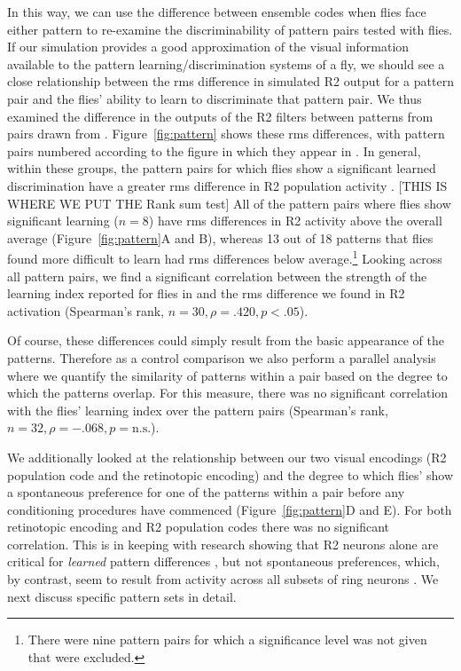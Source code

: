 In this way, we can use the difference between ensemble codes when flies face either pattern to re-examine the discriminability of pattern pairs tested with flies.
If our simulation provides a good approximation of the visual information available to the pattern learning/discrimination systems of a fly, we should see a close relationship between the \ac{rms} difference in simulated R2 output for a pattern pair and the flies' ability to learn to discriminate that pattern pair.
We thus examined the difference in the outputs of the R2 filters between patterns from pairs drawn from .
Figure~\ref{fig:pattern} shows these \ac{rms} differences, with pattern pairs numbered according to the figure in which they appear in .
In general, within these groups, the pattern pairs for which flies show a significant learned discrimination have a greater \ac{rms} difference in R2 population activity \cite{Ernst1999}.
[THIS IS WHERE WE PUT THE Rank sum test] All of the pattern pairs where flies show significant learning ($n=8$) have \ac{rms} differences in R2 activity above the overall average (Figure~\ref{fig:pattern}A and B), whereas 13 out of 18 patterns that flies found more difficult to learn had \ac{rms} differences below average.\footnote{There were nine pattern pairs for which a significance level was not given that were excluded.}
Looking across all pattern pairs, we find a significant correlation between the strength of the learning index reported for flies in  and the \ac{rms} difference we found in R2 activation (Spearman's rank, $n=30, \rho=.420, p < .05$).

\begin{comment}
Sig:
above: 8; below: 0; eq: 0; not given: 0; tot: 8
------
NS:
above: 5; below: 13; eq: 0; not given: 1; tot: 19
------
Sig not given:
above: 3; eq: 3; below: 0; not given: 3; tot: 9
------
tot tot: 36
\end{comment}

%

Of course, these differences could simply result from the basic appearance of the patterns.
Therefore as a control comparison we also perform a parallel analysis where we quantify the similarity of patterns within a pair based on the degree to which the patterns overlap.
For this measure, there was no significant correlation with the flies' learning index over the pattern pairs (Spearman's rank, $n=32, \rho=-.068,p=\mathrm{n.s.}$).

We additionally looked at the relationship between our two visual encodings (R2 population code and the retinotopic encoding) and the degree to which flies' show a spontaneous preference for one of the patterns within a pair before any conditioning procedures have commenced (Figure~\ref{fig:pattern}D and E). For both retinotopic encoding and R2 population codes there was no significant correlation. This is in keeping with research showing that R2 neurons alone are critical for \emph{learned} pattern differences \cite{Ernst1999}, but not spontaneous preferences, which, by contrast, seem to result from activity across all subsets of ring neurons \cite{Solanki2015}.
We next discuss specific pattern sets in detail.

